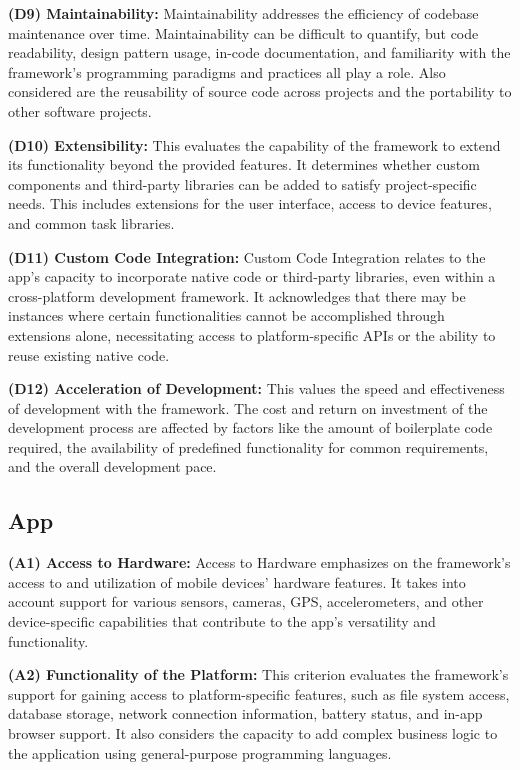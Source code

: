 \textbf{(D9) Maintainability:}
Maintainability addresses the efficiency of codebase maintenance over time. Maintainability can be difficult to quantify, but code readability, design pattern usage, in-code documentation, and familiarity with the framework's programming paradigms and practices all play a role. Also considered are the reusability of source code across projects and the portability to other software projects.

\textbf{(D10) Extensibility:}
This evaluates the capability of the framework to extend its functionality beyond the provided features. It determines whether custom components and third-party libraries can be added to satisfy project-specific needs. This includes extensions for the user interface, access to device features, and common task libraries.

\textbf{(D11) Custom Code Integration:}
Custom Code Integration relates to the app's capacity to incorporate native code or third-party libraries, even within a cross-platform development framework. It acknowledges that there may be instances where certain functionalities cannot be accomplished through extensions alone, necessitating access to platform-specific APIs or the ability to reuse existing native code.

\textbf{(D12) Acceleration of Development:}
This values the speed and effectiveness of development with the framework. The cost and return on investment of the development process are affected by factors like the amount of boilerplate code required, the availability of predefined functionality for common requirements, and the overall development pace.

\subsection{App}
\textbf{(A1) Access to Hardware:}
Access to Hardware emphasizes on the framework's access to and utilization of mobile devices' hardware features. It takes into account support for various sensors, cameras, GPS, accelerometers, and other device-specific capabilities that contribute to the app's versatility and functionality.

\textbf{(A2) Functionality of the Platform:}
This criterion evaluates the framework's support for gaining access to platform-specific features, such as file system access, database storage, network connection information, battery status, and in-app browser support. It also considers the capacity to add complex business logic to the application using general-purpose programming languages.

